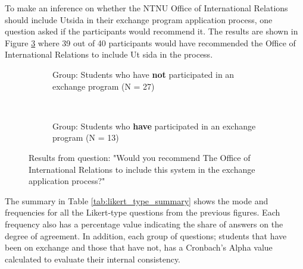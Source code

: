 \FloatBarrier


To make an inference on whether the NTNU Office of International Relations should include Utsida in their exchange program application process, one question asked if the participants would recommend it. The results are shown in Figure \ref{fig:office_recommendation} where 39 out of 40 participants would have recommended the Office of International Relations to include Ut
sida in the process. 


\FloatBarrier

\begin{figure}[h]
    \centering
    \begin{subfigure}[b]{0.4\textwidth}
        
        \caption{Group: Students who have \textbf{not} participated in an exchange program (N = 27)}
        \label{fig:gull}
    \end{subfigure}
    ~ \qquad %
    \begin{subfigure}[b]{0.4\textwidth}
       
        \caption{Group: Students who \textbf{have} participated in an exchange program (N = 13)}
        \label{fig:tiger}
    \end{subfigure}
    \caption{Results from question: "Would you recommend The Office of International Relations to include this system in the exchange application process?"}
    \label{fig:office_recommendation}
\end{figure}


\FloatBarrier

The summary in Table \ref{tab:likert_type_summary} shows the mode and frequencies for all the Likert-type questions from the previous figures. Each frequency also has a percentage value indicating the share of answers on the degree of agreement. In addition, each group of questions; students that have been on exchange and those that have not, has a Cronbach's Alpha value calculated to evaluate their internal consistency.


